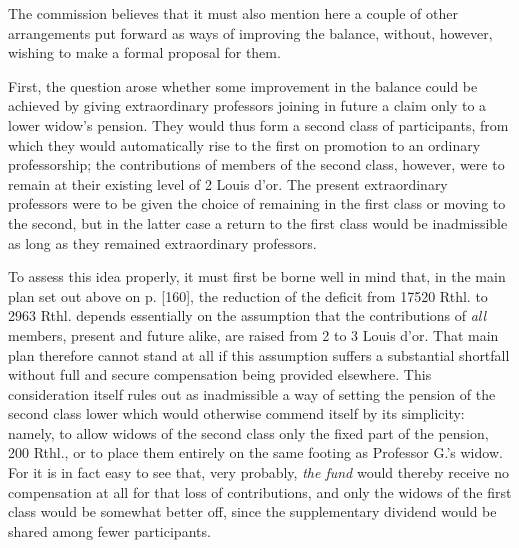 The commission believes that it must also mention here a couple of other arrangements put forward as ways of improving the balance, without, however, wishing to make a formal proposal for them.

First, the question arose whether some improvement in the balance could be achieved by giving extraordinary professors joining in future a claim only to a lower widow's pension. They would thus form a second class of participants, from which they would automatically rise to the first on promotion to an ordinary professorship; the contributions of members of the second class, however, were to remain at their existing level of 2 Louis d'or. The present extraordinary professors were to be given the choice of remaining in the first class or moving to the second, but in the latter case a return to the first class would be inadmissible as long as they remained extraordinary professors.

To assess this idea properly, it must first be borne well in mind that, in the main plan set out above on p. [160], the reduction of the deficit from 17520 Rthl. to 2963 Rthl. depends essentially on the assumption that the contributions of \textit{all} members, present and future alike, are raised from 2 to 3 Louis d'or. That main plan therefore cannot stand at all if this assumption suffers a substantial shortfall without full and secure compensation being provided elsewhere. This consideration itself rules out as inadmissible a way of setting the pension of the second class lower which would otherwise commend itself by its simplicity: namely, to allow widows of the second class only the fixed part of the pension, 200 Rthl., or to place them entirely on the same footing as Professor G.'s widow. For it is in fact easy to see that, very probably, \textit{the fund} would thereby receive no compensation at all for that loss of contributions, and only the widows of the first class would be somewhat better off, since the supplementary dividend would be shared among fewer participants.

